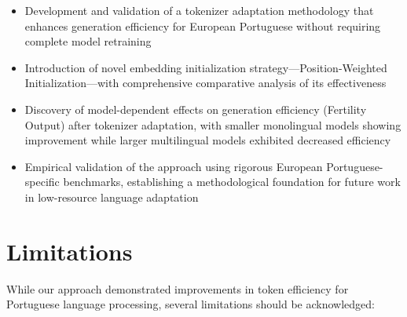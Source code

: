 \begin{itemize}
    \item Development and validation of a tokenizer adaptation methodology that enhances generation efficiency for European Portuguese without requiring complete model retraining
    
    \item Introduction of novel embedding initialization strategy—Position-Weighted Initialization—with comprehensive comparative analysis of its effectiveness
    
    \item Discovery of model-dependent effects on generation efficiency (Fertility Output) after tokenizer adaptation, with smaller monolingual models showing improvement while larger multilingual models exhibited decreased efficiency
    
    \item Empirical validation of the approach using rigorous European Portuguese-specific benchmarks, establishing a methodological foundation for future work in low-resource language adaptation
\end{itemize}

\section{Limitations}
While our approach demonstrated improvements in token efficiency for Portuguese language processing, several limitations should be acknowledged:

